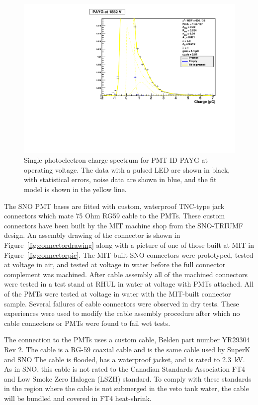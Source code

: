 \documentclass{JINST}
\begin{document}
\begin{figure}[ht]
\begin{center}
\includegraphics[width=4.5in]{graphics/PAYG_singlePE.pdf}
\caption{Single photoelectron charge spectrum for PMT ID PAYG at operating voltage.  The data with a pulsed LED are shown in black, with statistical errors, noise data are shown in blue, and the fit model is shown in the yellow line.
\label{fig:pmt_spe_q}}
\end{center}
\end{figure}

The SNO PMT bases are fitted with custom, waterproof TNC-type jack
connectors which mate 75 Ohm RG59 cable to the PMTs.  These custom
connectors have been built by the MIT machine shop from the SNO-TRIUMF
design. An assembly drawing of the connector is shown in
Figure~\ref{fig:connectordrawing} along with a picture of one of those
built at MIT in Figure~\ref{fig:connectorpic}. The MIT-built SNO
connectors were prototyped, tested at voltage in air, and tested at
voltage in water before the full connector complement was machined.
After cable assembly all of the machined connectors were tested in
a test stand at RHUL in water at voltage with PMTs attached.  All of the
PMTs were tested at voltage in water with the MIT-built connector
sample.  Several failures of cable connectors were observed in dry
tests.  These experiences were used to modify the cable assembly
procedure after which no cable connectors or PMTs were found to fail
wet tests.

The connection to the PMTs uses a custom cable, Belden part number YR29304 Rev 2.  The cable is a
RG-59 coaxial cable and is the same cable used by SuperK and SNO
The cable is flooded, has a waterproof jacket, and is rated to 2.3~kV.
As in SNO, this cable is not rated to the Canadian Standards Association
FT4 and Low Smoke Zero Halogen (LSZH) standard.  To comply with these
standards in the region where the cable is not submerged in the veto tank
water, the cable will be bundled and covered in FT4 heat-shrink.
\end{document}
